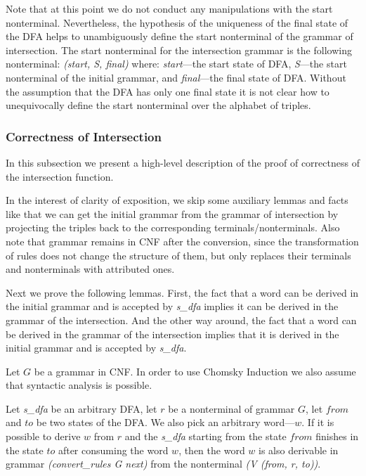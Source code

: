 Note that at this point we do not conduct any manipulations with the start nonterminal. Nevertheless, the hypothesis of the uniqueness of the final state of the DFA helps to unambiguously define the start nonterminal of the grammar of intersection. The start nonterminal for the intersection grammar is the following nonterminal: \textit{(start, S, final)} where: \textit{start}---the start state of DFA, \textit{S}---the start nonterminal of the initial grammar, and \textit{final}---the final state of DFA. Without the assumption that the DFA has only one final state it is not clear how to unequivocally define the start nonterminal over the alphabet of triples.

\subsubsection{Correctness of Intersection}
\label{sec:correctintersection}

In this subsection we present a high-level description of the proof of correctness of the intersection function.

In the interest of clarity of exposition, we skip some auxiliary lemmas and facts like that we can get the initial grammar from the grammar of intersection by projecting the triples back to the corresponding terminals/nonterminals. Also note that grammar remains in CNF after the conversion, since the transformation of rules does not change the structure of them, but only replaces their terminals and nonterminals with attributed ones.

Next we prove the following lemmas. First, the fact that a word can be derived in the initial grammar and is accepted by \textit{s\_dfa} implies it can be derived in the grammar of the intersection. And the other way around, the fact that a word can be derived in the grammar of the intersection implies that it is derived in the initial grammar and is accepted by \textit{s\_dfa}.

Let $G$ be a grammar in CNF. In order to use Chomsky Induction we also assume that syntactic analysis is possible. 


\begin{theorem}
    Let \textit{s\_dfa} be an arbitrary DFA, let $r$ be a nonterminal of grammar $G$, let $from$ and $to$ be two states of the DFA. We also pick an arbitrary word---$w$. If it is possible to derive $w$ from $r$ and the \textit{s\_dfa} starting from the state $from$ finishes in the state $to$ after consuming the word $w$, then the word $w$ is also derivable in grammar \textit{(convert\_rules G next)} from the nonterminal \textit{(V (from, r, to))}.
\end{theorem}


